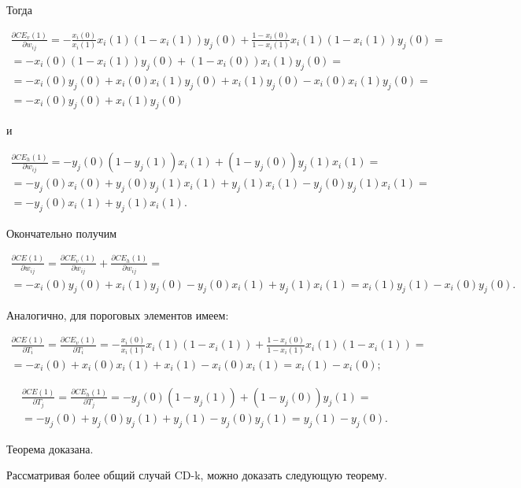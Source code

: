 Тогда

\begin{multline*}
	\frac{\partial CE_v(1)}{\partial w_{ij}} = -\frac{x_i(0)}{x_i(1)}x_i(1)(1-x_i(1))y_j(0)+\frac{1-x_i(0)}{1-x_i(1)}x_i(1)(1-x_i(1))y_j(0) = \\ = -x_i(0)(1-x_i(1))y_j(0)+(1-x_i(0))x_i(1)y_j(0)=\\=-x_i(0)y_j(0)+x_i(0)x_i(1)y_j(0)+x_i(1)y_j(0)-x_i(0)x_i(1)y_j(0)=\\=-x_i(0)y_j(0)+x_i(1)y_j(0) 
\end{multline*}

и

\begin{multline*}
	\frac{\partial CE_h(1)}{\partial w_{ij}} = -y_j(0)(1-y_j(1))x_i(1)+(1-y_j(0))y_j(1)x_i(1) = \\ = -y_j(0)x_i(0)+y_j(0)y_j(1)x_i(1)+y_j(1)x_i(1)-y_j(0)y_j(1)x_i(1) = \\ = -y_j(0)x_i(1)+y_j(1)x_i(1). 
\end{multline*}

Окончательно получим

\begin{multline*}
	\frac{\partial CE(1)}{\partial w_{ij}} = \frac{\partial CE_v(1)}{\partial w_{ij}} + \frac{\partial CE_h(1)}{\partial w_{ij}} = \\ = -x_i(0)y_j(0)+x_i(1)y_j(0) -y_j(0)x_i(1)+y_j(1)x_i(1) = x_i(1)y_j(1) - x_i(0)y_j(0).
\end{multline*}

Аналогично, для пороговых элементов имеем:

\begin{multline*}
	\frac{\partial CE(1)}{\partial T_i} = \frac{\partial CE_v(1)}{\partial T_i} = -\frac{x_i(0)}{x_i(1)}x_i(1)(1-x_i(1))+\frac{1-x_i(0)}{1-x_i(1)}x_i(1)(1-x_i(1)) = \\ = -x_i(0) + x_i(0)x_i(1)+x_i(1)-x_i(0)x_i(1) = x_i(1)-x_i(0);
\end{multline*}

\begin{multline*}
	\frac{\partial CE(1)}{\partial T_j} = \frac{\partial CE_h(1)}{\partial T_j} = -y_j(0)(1-y_j(1)) + (1-y_j(0))y_j(1) = \\ = -y_j(0) + y_j(0)y_j(1) + y_j(1) - y_j(0)y_j(1) = y_j(1) - y_j(0).
\end{multline*}

Теорема доказана. 

Рассматривая более общий случай CD-k, можно доказать следующую теорему.

